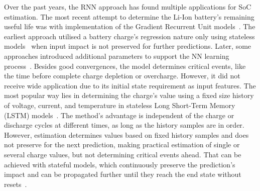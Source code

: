 % 
%
Over the past years, the RNN approach has found multiple applications for SoC estimation.
The most recent attempt to determine the Li-Ion battery's remaining useful life was with implementation of the Gradient Recurrent Unit models~\cite{song_lithium-ion_2018,javid_adaptive_2020,xiao_accurate_2019,jiao_gru-rnn_2020}.
The earliest approach utilised a battery charge's regression nature only using stateless models~\cite{song_lithium-ion_2018,jiao_gru-rnn_2020,xiao_accurate_2019} when input impact is not preserved for further predictions.
Later, some approaches introduced additional parameters to support the NN learning process~\cite{mamo_long_2020,jiao_gru-rnn_2020,javid_adaptive_2020}.
Besides good convergences, the model determines critical events, like the time before complete charge depletion or overcharge.
However, it did not receive wide application due to its initial state requirement as input features.
The most popular way lies in determining the charge's value using a fixed size history of voltage, current, and temperature in stateless Long Short-Term Memory (LSTM) models~\cite{Chemali2017,mamo_long_2020,javid_adaptive_2020,zhang_deep_2020}.
The method's advantage is independent of the charge or discharge cycles at different times, as long as the history samples are in order.
However, estimation determines values based on fixed history samples and does not preserve for the next prediction, making practical estimation of single or several charge values, but not determining critical events ahead.
That can be achieved with stateful models, which continuously preserve the prediction's impact and can be propagated further until they reach the end state without resets~\cite{zhu_statefulnes_tfdocs_2020}.

